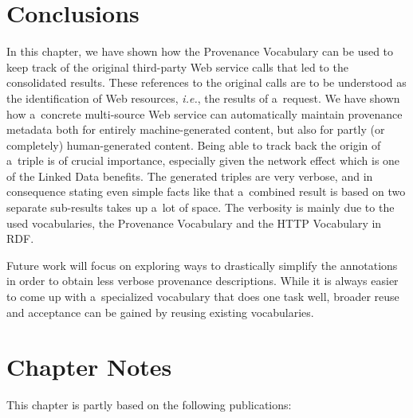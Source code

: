 \section{Conclusions}                                                        

In this chapter, we have shown how the Provenance
Vocabulary can be used to keep track of the original
third-party Web service calls that led to the consolidated
results. These references to the original calls
are to be understood as the identification of Web resources,
\emph{i.e.}, the results of a~request.
We have shown how a~concrete multi-source Web service can
automatically maintain provenance metadata
both for entirely machine-generated content,
but also for partly (or completely) human-generated content.
Being able to track back the origin of a~triple
is of crucial importance,
especially given the network effect which is one of the
Linked Data benefits.
The generated triples are very verbose,
and in consequence stating even simple facts like
that a~combined result is based on two separate sub-results
takes up a~lot of space.
The verbosity is mainly due to the used vocabularies,
the Provenance Vocabulary and the HTTP Vocabulary in RDF.

Future work will focus on exploring ways
to drastically simplify the annotations in order to obtain
less verbose provenance descriptions.
While it is always easier to come up with a~specialized vocabulary
that does one task well, broader reuse and acceptance
can be gained by reusing existing vocabularies.

\section*{Chapter Notes}
This chapter is partly based on the following publications:



